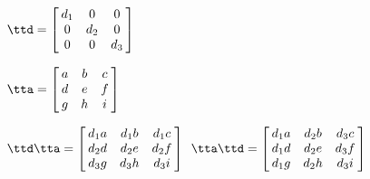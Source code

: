 {$\ttd = \left[\hskip -3pt \begin{array}{ccc} d_1&0&0\\  0&d_2&0
\\  0&0&d_3\end{array}\hskip -3pt \right]$
 
$\tta = \left[\hskip -3pt \begin{array}{ccc} a&b&c\\  d&e&f
\\  g&h&i\end{array}\hskip -3pt \right] $}
{$\ttd\tta= \left[\hskip -3pt \begin{array}{ccc} d_1a&d_1b&d_1c\\  d_2d&d_2e&d_2f
\\  d_3g&d_3h&d_3i\end{array}\hskip -3pt \right] $\ 
$\tta\ttd =  \left[\hskip -3pt \begin{array}{ccc} d_1a&d_2b&d_3c\\  d_1d&d_2e&d_3f
\\  d_1g&d_2h&d_3i\end{array}\hskip -3pt \right]$
}
 
